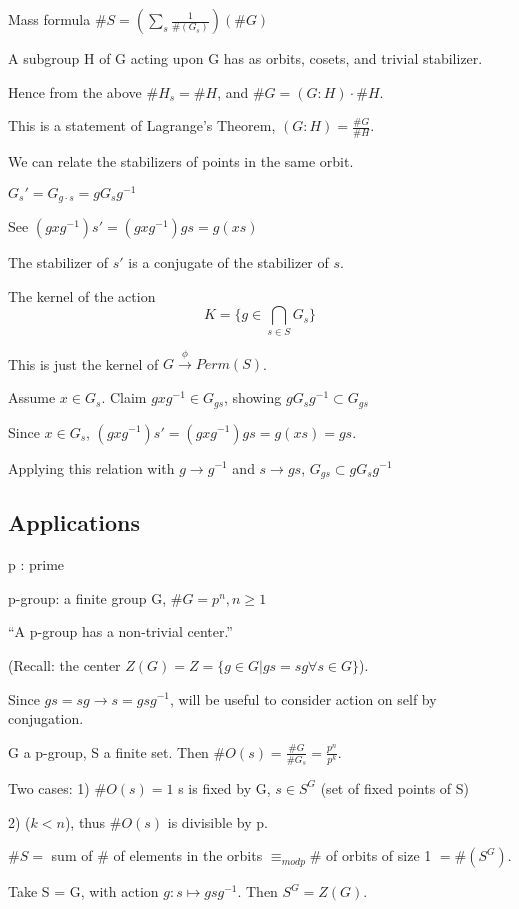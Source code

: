 \documentclass[12pt]{article}
\begin{document}
Mass formula $\#S = (\sum_s\frac{1}{\#(G_s)})(\#G)$

\noindent
A subgroup H of G acting upon G has as orbits, cosets, and trivial stabilizer.

Hence from the above $\#H_s = \#H$, and $\#G = (G:H) \cdot \#H$.

This is a statement of Lagrange's Theorem, $(G:H) = \frac{\#G}{\#H}$.

\noindent
We can relate the stabilizers of points in the same orbit.

$G_s' = G_{g \cdot s} = gG_sg^{-1}$

See $(gxg^{-1})s' = (gxg^{-1})gs = g(xs)$ 

The stabilizer of $s'$ is a conjugate of the stabilizer of $s$.

\noindent
The kernel of the action $$K = \{g\in \bigcap_{s \in S}G_s\}$$

This is just the kernel of $G \xrightarrow{\phi} Perm(S)$.

\noindent
Assume $x \in G_s$.  Claim $gxg^{-1} \in G_{gs}$, showing $gG_sg^{-1} \subset G_{gs}$

Since $x \in G_s$, $(gxg^{-1})s' = (gxg^{-1})gs = g(xs) = gs$.

Applying this relation with $g \to g^{-1}$ and $s \to gs$, $G_{gs} \subset gG_sg^{-1}$

\subsection{Applications}

p : prime

\noindent
p-group: a finite group G, $\#G = p^n, n \geq 1$

\noindent
``A p-group has a non-trivial center.''

(Recall: the center $Z(G) = Z = \{g \in G | gs = sg \forall s\in G\}$).

Since $gs = sg \to s = gsg^{-1}$, will be useful to consider action on self by conjugation.

G a p-group, S a finite set.  Then $\#O(s) = \frac{\#G}{\#G_s} = \frac{p^n}{p^k}$.

Two cases: 1) $\#O(s) = 1$ s is fixed by G, $s \in S^G$ (set of fixed points of S)

2) ($k < n$), thus $\#O(s)$ is divisible by p.

$\#S =$ sum of \# of elements in the orbits $\equiv_{mod p} \#$ of orbits of size 1 $= \#(S^G)$.

Take S = G, with action $g: s \mapsto gsg^{-1}$.  Then $S^G = Z(G)$.
\end{document}
